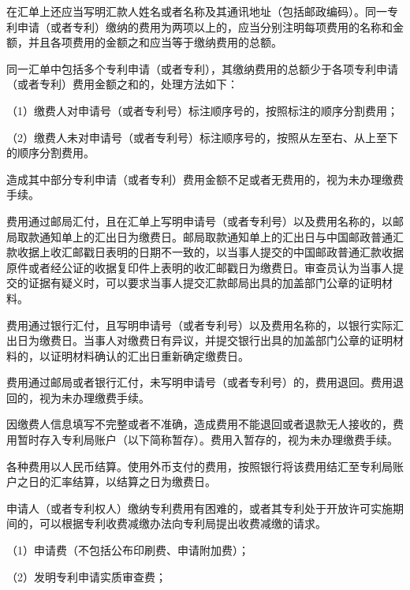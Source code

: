 在汇单上还应当写明汇款人姓名或者名称及其通讯地址（包括邮政编码）。同一专利申请（或者专利）缴纳的费用为两项以上的，应当分别注明每项费用的名称和金额，并且各项费用的金额之和应当等于缴纳费用的总额。

同一汇单中包括多个专利申请（或者专利），其缴纳费用的总额少于各项专利申请（或者专利）费用金额之和的，处理方法如下：

{\setlength{\parindent}{17.1bp}（1）缴费人对申请号（或者专利号）标注顺序号的，按照标注的顺序分割费用；\par}

{\setlength{\parindent}{17.1bp}（2）缴费人未对申请号（或者专利号）标注顺序号的，按照从左至右、从上至下的顺序分割费用。\par}

造成其中部分专利申请（或者专利）费用金额不足或者无费用的，视为未办理缴费手续。

费用通过邮局汇付，且在汇单上写明申请号（或者专利号）以及费用名称的，以邮局取款通知单上的汇出日为缴费日。邮局取款通知单上的汇出日与中国邮政普通汇款收据上收汇邮戳日表明的日期不一致的，以当事人提交的中国邮政普通汇款收据原件或者经公证的收据复印件上表明的收汇邮戳日为缴费日。审查员认为当事人提交的证据有疑义时，可以要求当事人提交汇款邮局出具的加盖部门公章的证明材料。

费用通过银行汇付，且写明申请号（或者专利号）以及费用名称的，以银行实际汇出日为缴费日。当事人对缴费日有异议，并提交银行出具的加盖部门公章的证明材料的，以证明材料确认的汇出日重新确定缴费日。

费用通过邮局或者银行汇付，未写明申请号（或者专利号）的，费用退回。费用退回的，视为未办理缴费手续。

因缴费人信息填写不完整或者不准确，造成费用不能退回或者退款无人接收的，费用暂时存入专利局账户（以下简称暂存）。费用入暂存的，视为未办理缴费手续。

各种费用以人民币结算。使用外币支付的费用，按照银行将该费用结汇至专利局账户之日的汇率结算，以结算之日为缴费日。

申请人（或者专利权人）缴纳专利费用有困难的，或者其专利处于开放许可实施期间的，可以根据专利收费减缴办法向专利局提出收费减缴的请求。

{\setlength{\parindent}{17.1bp}（1）申请费（不包括公布印刷费、申请附加费）；\par}

{\setlength{\parindent}{17.1bp}（2）发明专利申请实质审查费；\par}

